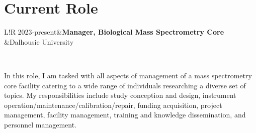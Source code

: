 \documentclass[11pt]{article}
\newcommand\VRule{\color{lightgray}\vrule width 0.5pt}
\begin{document}
\section*{Current Role}
\begin{tabular}{L!{\VRule}R}
	2023-present&\textbf{Manager, Biological Mass Spectrometry Core}\\
	&Dalhousie University\\
\end{tabular}\\

\begin{addmargin}[7.5em]{2em}%
	In this role, I am tasked with all aspects of management of a mass spectrometry core facility catering to a wide range of individuals researching a diverse set of topics. My responsibilities include study conception and design, instrument operation/maintenance/calibration/repair, funding acquisition, project management, facility management, training and knowledge dissemination, and personnel management. 
\end{addmargin}
\end{document}

